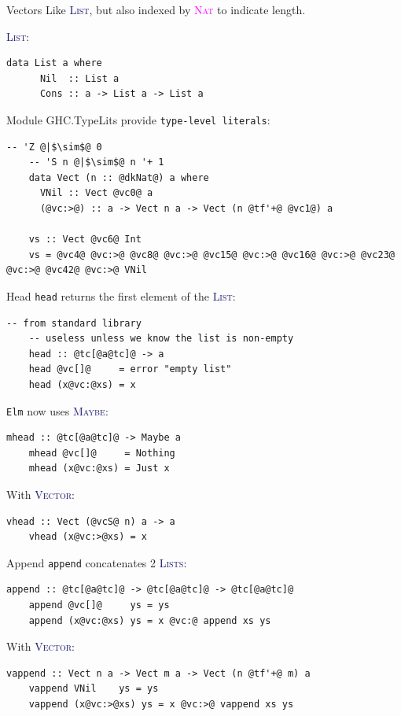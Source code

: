 \documentclass[xcolor={usenames,dvipsnames}]{beamer}
\newcommand{\htycon}[1]{\textcolor{MidnightBlue}{\textsc{#1}}}
\newcommand{\hkind}[1]{\textcolor{Fuchsia}{\textsc{#1}}}
\begin{document}
\begin{frame}[fragile]{Vectors}
  Like \htycon{List}, but also indexed by \hkind{Nat} to indicate length.

  \htycon{List}:
  \begin{lstlisting}[style=hask]
    data List a where
      Nil  :: List a
      Cons :: a -> List a -> List a
  \end{lstlisting}

  Module GHC.TypeLits provide \texttt{type-level literals}:
  \begin{lstlisting}[style=hask]
    -- 'Z @|$\sim$@ 0
    -- 'S n @|$\sim$@ n '+ 1
    data Vect (n :: @dkNat@) a where
      VNil :: Vect @vc0@ a
      (@vc:>@) :: a -> Vect n a -> Vect (n @tf'+@ @vc1@) a

    vs :: Vect @vc6@ Int
    vs = @vc4@ @vc:>@ @vc8@ @vc:>@ @vc15@ @vc:>@ @vc16@ @vc:>@ @vc23@ @vc:>@ @vc42@ @vc:>@ VNil
  \end{lstlisting}
\end{frame}

\begin{frame}[fragile]{Head}
  \texttt{head} returns the first element of the \htycon{List}:
  \begin{lstlisting}[style=hask]
    -- from standard library
    -- useless unless we know the list is non-empty
    head :: @tc[@a@tc]@ -> a
    head @vc[]@     = error "empty list"
    head (x@vc:@xs) = x
  \end{lstlisting}

  \pause
  \texttt{Elm} now uses \htycon{Maybe}:
  \begin{lstlisting}[style=hask]
    mhead :: @tc[@a@tc]@ -> Maybe a
    mhead @vc[]@     = Nothing
    mhead (x@vc:@xs) = Just x
  \end{lstlisting}

  \pause
  With \htycon{Vector}:
  \begin{lstlisting}[style=hask]
    vhead :: Vect (@vcS@ n) a -> a
    vhead (x@vc:>@xs) = x
  \end{lstlisting}
\end{frame}

\begin{frame}[fragile]{Append}
  \texttt{append} concatenates 2 \htycon{Lists}:
  \begin{lstlisting}[style=hask]
    append :: @tc[@a@tc]@ -> @tc[@a@tc]@ -> @tc[@a@tc]@
    append @vc[]@     ys = ys
    append (x@vc:@xs) ys = x @vc:@ append xs ys
  \end{lstlisting}

  With \htycon{Vector}:
  \begin{lstlisting}[style=hask]
    vappend :: Vect n a -> Vect m a -> Vect (n @tf'+@ m) a
    vappend VNil    ys = ys
    vappend (x@vc:>@xs) ys = x @vc:>@ vappend xs ys
  \end{lstlisting}
\end{frame}
\end{document}
